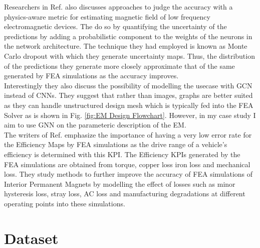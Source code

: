 \documentclass{report} %
\begin{document}
Researchers in Ref. \cite{DL-MF-2019} also discusses approaches to judge the accuracy with a physics-aware metric for estimating 
magnetic field of low frequency electromagnetic devices. The do so by quantifying the uncertainty of the predictions by adding a probabilistic component to the weights 
of the neurons in the network architecture. The technique they had employed is known as  Monte Carlo dropout with which they generate uncertainty maps. 
Thus, the distribution of the predictions they generate more closely approximate that of the same generated by \ac{FEA} simulations as the accuracy improves.\\
Interestingly they also discuss the possibility of modelling the usecase with \ac{GCN} instead of \ac{CNN}s.
They suggest that rather than images, graphs are better suited as they can handle unstructured design mesh which is typically fed into the \ac{FEA} Solver 
as is shown in Fig. \ref{fig:EM Design Flowchart}. However, in my case study I aim to use \ac{GNN} on the parameteric description of the \ac{EM}. \\

The writers of Ref. \cite{ETA-LA-2020} emphasize the importance of having a very low error rate for the Efficiency Maps by \ac{FEA} simulations as the drive range of a 
vehicle's efficiency is determined with this \ac{KPI}. The Efficiency \ac{KPI}s generated by the \ac{FEA} simulations are obtained from torque, copper loss iron loss 
and mechanical loss. They study methods to further improve the accuracy of \ac{FEA} simulations of Interior Permanent Magnets by modelling the effect 
of losses such as minor hysteresis loss, stray loss, AC loss and manufacturing degradations at different operating points into these simulations.\\

\chapter{Dataset} 
\end{document}
